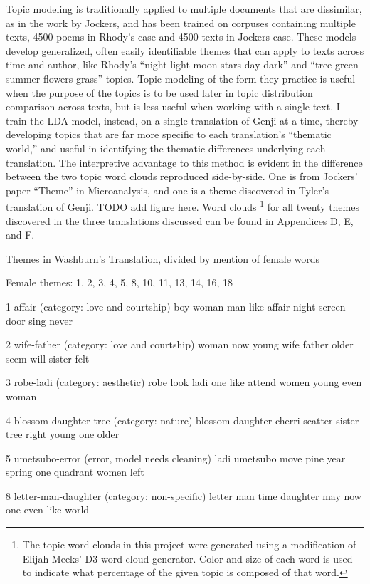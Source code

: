 \documentclass[12pt]{article}
\begin{document}
\begin{flushleft}
\begin{spacing}{2.0}
Topic modeling is traditionally applied to multiple documents that are dissimilar, as in the work by Jockers, and has been trained on corpuses containing multiple texts, 4500 poems in Rhody’s case and 4500 texts in Jockers case. These models develop generalized, often easily identifiable themes that can apply to texts across time and author, like Rhody’s ``night light moon stars day dark'' and ``tree green summer flowers grass'' topics. Topic modeling of the form they practice is useful when the purpose of the topics is to be used later in topic distribution comparison across texts, but is less useful when working with a single text. I train the LDA model, instead, on a single translation of Genji at a time, thereby developing topics that are far more specific to each translation’s ``thematic world,'' and useful in identifying the thematic differences underlying each translation. The interpretive advantage to this method is evident in the difference between the two topic word clouds reproduced side-by-side. One is from Jockers’ paper ``Theme'' in Microanalysis, and one is a theme discovered in Tyler’s translation of Genji. TODO add figure here. Word clouds \footnote{The topic word clouds in this project were generated using a modification of Elijah Meeks’ D3 word-cloud generator. Color and size of each word is used to indicate what percentage of the given topic is composed of that word.} for all twenty themes discovered in the three translations discussed can be found in Appendices D, E, and F.

Themes in Washburn’s Translation, divided by mention of female words

Female themes: 
1, 2, 3, 4, 5, 8, 10, 11, 13, 14, 16, 18

1 affair (category: love and courtship)
boy woman man like affair night screen door sing never

2 wife-father (category: love and courtship)
woman now young wife father older seem will sister felt

3 robe-ladi (category: aesthetic)
robe look ladi one like attend women young even woman 

4 blossom-daughter-tree (category: nature)
blossom daughter cherri scatter sister tree right young one older

5 umetsubo-error (error, model needs cleaning)
ladi umetsubo move pine year spring one quadrant women left 

8 letter-man-daughter (category: non-specific)
letter man time daughter may now one even like world 


\end{spacing}
\end{flushleft}
\end{document}
